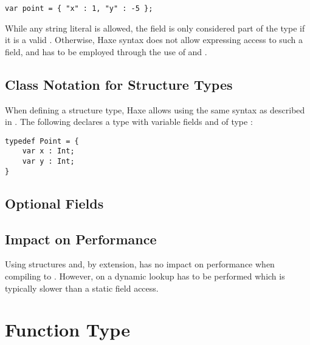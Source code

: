 \begin{lstlisting}
var point = { "x" : 1, "y" : -5 };
\end{lstlisting}
While any string literal is allowed, the field is only considered part of the type if it is a valid . Otherwise, Haxe syntax does not allow expressing access to such a field, and  has to be employed through the use of  and .

\subsection{Class Notation for Structure Types}
\label{types-structure-class-notation}

When defining a structure type, Haxe allows using the same syntax as described in . The following  declares a  type with variable fields  and  of type :

\begin{lstlisting}
typedef Point = {
    var x : Int;
    var y : Int;
}
\end{lstlisting}

\subsection{Optional Fields}
\label{types-structure-optional-fields}


\subsection{Impact on Performance}
\label{types-structure-performance}

Using structures and, by extension, has no impact on performance when compiling to . However, on  a dynamic lookup has to be performed which is typically slower than a static field access.



\section{Function Type}
\label{types-function}

